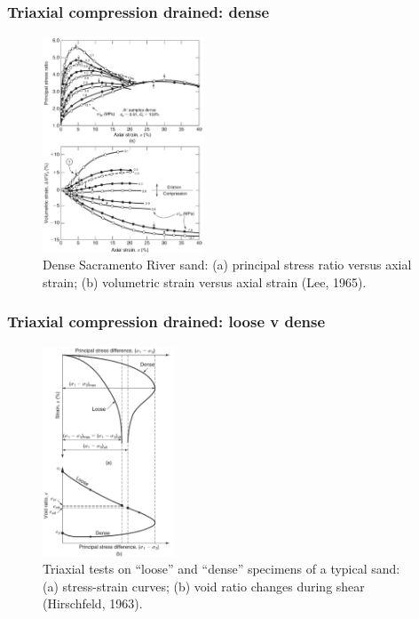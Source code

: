\documentclass[notes]{beamer}
\begin{document}
\begin{frame}
	\frametitle{Triaxial compression drained: dense}
	\begin{figure}
		\includegraphics[width=0.43\textwidth]{figs/tx-drained-dense.png}
		\caption*{Dense Sacramento River sand: (a) principal stress ratio versus
			axial strain; (b) volumetric strain versus axial strain (Lee, 1965).}
	\end{figure}
\end{frame}

\begin{frame}
	\frametitle{Triaxial compression drained: loose v dense}
	\begin{figure}
		\includegraphics[width=0.35\textwidth]{figs/tx-drained-loose-dense.png}
		\caption*{Triaxial tests on “loose” and “dense” specimens of a typical sand: (a) stress-strain curves; (b) void
			ratio changes during shear (Hirschfeld, 1963).}
	\end{figure}
\end{frame}
\end{document}
